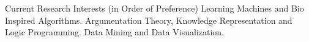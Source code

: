 \begin{rubric}{Current Research Interests (in Order of Preference)}
	Learning Machines and Bio Inspired Algorithms.
	Argumentation Theory, Knowledge Representation and Logic Programming.
	Data Mining and Data Visualization.

\end{rubric}
